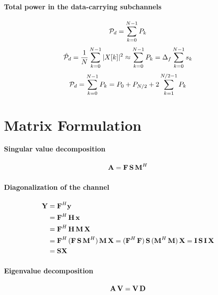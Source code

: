 \paragraph{Total power in the data-carrying subchannels}
\[
{\cal P}_d = \sum_{k=0}^{N-1} P_k
\]
\[
\hat {{\cal P}}_d = \frac{1}{N}\sum_{k=0}^{N-1} |X[k]|^2 \approx \sum_{k=0}^{N-1} P_k = \Delta_f \sum_{k=0}^{N-1} s_k
\]
\[
{\cal P}_d = \sum_{k=0}^{N-1} P_k = P_0 + P_{N/2} + 2 \sum_{k=1}^{N/2-1} P_k
\]

\section*{Matrix Formulation}

\paragraph{Singular value decomposition}
\begin{equation}
{\textbf A} = {\textbf F} \, {\textbf S} \, {\textbf M}^H
\label{eq:svd_decomposition}
\end{equation}

\paragraph{Diagonalization of the channel}
\begin{align*}
{\textbf Y} &= {\textbf F}^H {\textbf y} \\
&= {\textbf F}^H \, {\textbf H} \, {\textbf x} \\
&= {\textbf F}^H \, {\textbf H} \, {\textbf M} \, {\textbf X} \\
&= {\textbf F}^H \, ({\textbf F} \, {\textbf S} \, {\textbf M}^H) \, {\textbf M} \, {\textbf X}  = ({\textbf F}^H \, {\textbf F}) \, {\textbf S} \, ({\textbf M}^H \, {\textbf M}) \, {\textbf X}  = {\textbf I} \, {\textbf S} \, {\textbf I} \, {\textbf X} \\
&= {\textbf S} {\textbf X}
\end{align*}

\paragraph{Eigenvalue decomposition}
\begin{equation}
{\textbf A} \, {\textbf V} = {\textbf V} \, {\textbf D}
\label{eq:eigenvalueDecomposition}
\end{equation}
